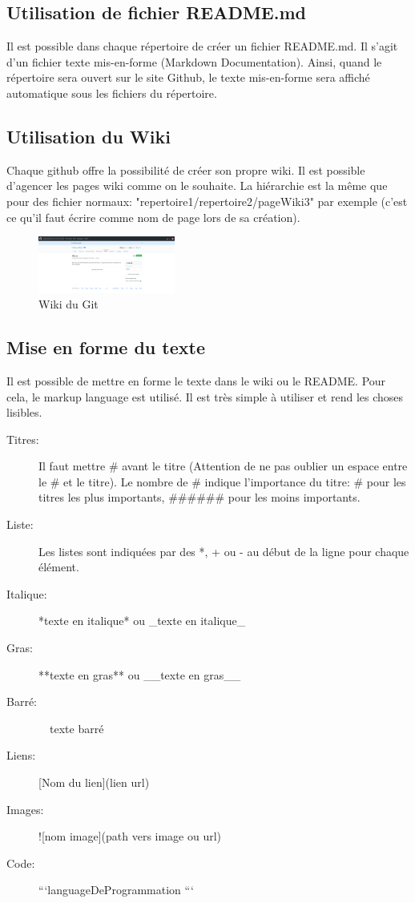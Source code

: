 \documentclass[a4paper, 11pt]{report}
\begin{document}
\subsection{Utilisation de fichier README.md}
Il est possible dans chaque répertoire de créer un fichier README.md. Il s'agit d'un fichier texte mis-en-forme (Markdown Documentation). Ainsi, quand le répertoire sera ouvert sur le site Github, le texte mis-en-forme sera affiché automatique sous les fichiers du répertoire.


\subsection{Utilisation du Wiki}
Chaque github offre la possibilité de créer son propre wiki. Il est possible d'agencer les pages wiki comme on le souhaite. La hiérarchie est la même que pour des fichier normaux: "repertoire1/repertoire2/pageWiki3" par exemple (c'est ce qu'il faut écrire comme nom de page lors de sa création).

\begin{figure}[h!]
\begin{centering}
\includegraphics[width=0.4\textwidth]{images/wikiGit.png}
\caption{Wiki du Git}
\par\end{centering}
\end{figure}

\subsection{Mise en forme du texte}
Il est possible de mettre en forme le texte dans le wiki ou le README. Pour cela, le markup language est utilisé. Il est très simple à utiliser et rend les choses lisibles.

\begin{description}
\item[Titres:] Il faut mettre \# avant le titre (Attention de ne pas oublier un espace entre le \# et le titre). Le nombre de \# indique l'importance du titre: \# pour les titres les plus importants, \#\#\#\#\#\# pour les moins importants.
\item[Liste:] Les listes sont indiquées par des *, + ou - au début de la ligne pour chaque élément.
\item[Italique:] *texte en italique* ou \_texte en italique\_
\item[Gras:] **texte en gras** ou \_\_texte en gras\_\_
\item[Barré:]~~texte barré~~
\item[Liens:] [Nom du lien](lien url)
\item[Images:] ![nom image](path vers image ou url)
\item[Code:] ```languageDeProgrammation   ```
\end{description}
\end{document}
